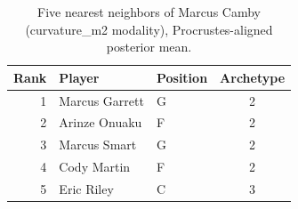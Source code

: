 \begin{table}[htbp]
  \centering\small
  \begin{tabular}{rllc}
    \toprule
    Rank & Player & Position & Archetype \\
    \midrule
    1 & Marcus Garrett & G & 2 \\
    2 & Arinze Onuaku & F & 2 \\
    3 & Marcus Smart & G & 2 \\
    4 & Cody Martin & F & 2 \\
    5 & Eric Riley & C & 3 \\
    \bottomrule
  \end{tabular}
  \caption{Five nearest neighbors of Marcus Camby (curvature_m2 modality), Procrustes-aligned posterior mean.}
  \label{tab:Marcus_Camby_neighbors_curvature_m2}
\end{table}

